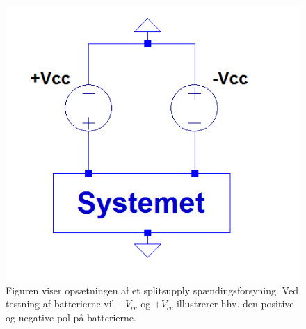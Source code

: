 \begin{figure}[H]
\centering
\includegraphics[scale=0.5]{figures/cProblemloesning/Splitsupply.PNG}
\caption{Figuren viser opsætningen af et splitsupply spændingsforsyning. Ved testning af batterierne vil $-V_{cc}$ og $+V_{cc}$ illustrerer hhv. den positive og negative pol på batterierne.}
\label{fig:splitsupply}
\end{figure}
